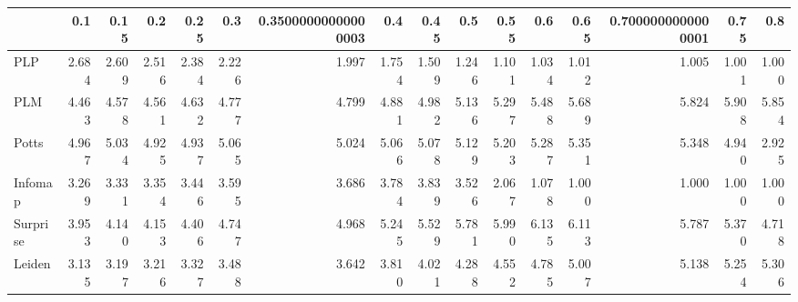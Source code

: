 \begin{tabular}{lrrrrrrrrrrrrrrr}
\toprule
{} &   0.1 &  0.15 &   0.2 &  0.25 &   0.3 & 0.35000000000000003 &   0.4 &  0.45 &   0.5 &  0.55 &   0.6 &  0.65 & 0.7000000000000001 &  0.75 &   0.8 \\
\midrule
PLP      & 2.684 & 2.609 & 2.516 & 2.384 & 2.226 &               1.997 & 1.754 & 1.509 & 1.246 & 1.101 & 1.034 & 1.012 &              1.005 & 1.001 & 1.000 \\
PLM      & 4.463 & 4.578 & 4.561 & 4.632 & 4.777 &               4.799 & 4.881 & 4.982 & 5.136 & 5.297 & 5.488 & 5.689 &              5.824 & 5.908 & 5.854 \\
Potts    & 4.967 & 5.034 & 4.925 & 4.937 & 5.065 &               5.024 & 5.066 & 5.078 & 5.129 & 5.203 & 5.287 & 5.351 &              5.348 & 4.940 & 2.925 \\
Infomap  & 3.269 & 3.331 & 3.354 & 3.446 & 3.595 &               3.686 & 3.784 & 3.839 & 3.526 & 2.067 & 1.078 & 1.000 &              1.000 & 1.000 & 1.000 \\
Surprise & 3.953 & 4.140 & 4.153 & 4.406 & 4.747 &               4.968 & 5.245 & 5.529 & 5.781 & 5.990 & 6.135 & 6.113 &              5.787 & 5.370 & 4.718 \\
Leiden   & 3.135 & 3.197 & 3.216 & 3.327 & 3.488 &               3.642 & 3.810 & 4.021 & 4.288 & 4.552 & 4.785 & 5.007 &              5.138 & 5.254 & 5.306 \\
\bottomrule
\end{tabular}
